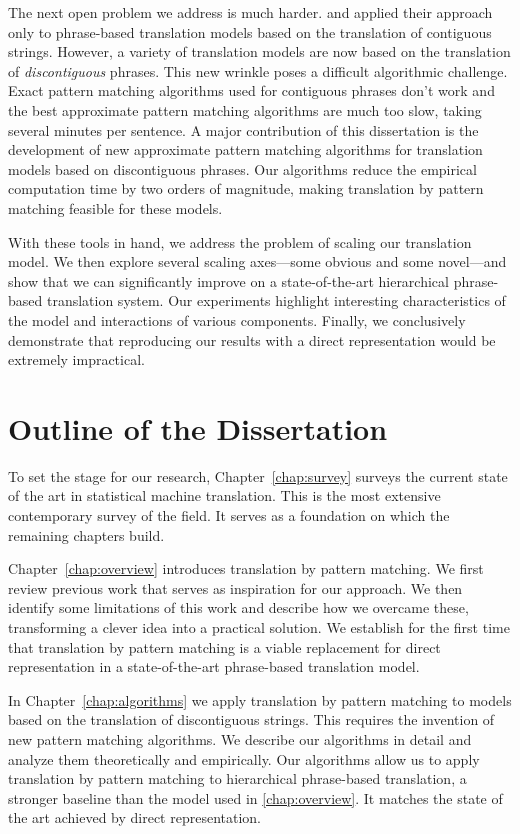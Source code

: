 The next open problem we address is much harder.
\citet{Callison-Burch:2005:acl} and \citet{Zhang:2005:eamt}
applied their approach only to phrase-based translation models 
based on the translation of contiguous strings.  However,
a variety of translation models are now based on the 
translation of {\em discontiguous} phrases.  This new wrinkle
poses a difficult algorithmic challenge.
Exact pattern matching algorithms used for contiguous phrases don't work and
the best approximate pattern matching algorithms are much too slow,
taking several minutes per sentence.  A major contribution of
this dissertation is the development of new approximate 
pattern matching algorithms for translation models based on
discontiguous phrases.  Our algorithms reduce the empirical computation
time by two orders of magnitude, making translation by pattern matching
feasible for these models.

With these tools in hand, we address the problem of scaling
our translation model.  We then explore several scaling axes---some obvious and 
some novel---and show that we can significantly improve on 
a state-of-the-art hierarchical phrase-based translation system.  
Our experiments highlight interesting characteristics of the model
and interactions of various components.
Finally, we conclusively demonstrate that reproducing our results
with a direct representation would be extremely impractical.

\section{Outline of the Dissertation}

To set the stage for our research, Chapter~\ref{chap:survey} surveys the
current state of the art in statistical machine translation.  This is the
most extensive contemporary survey of the field.  It serves as a foundation 
on which the remaining chapters build.

Chapter~\ref{chap:overview} introduces translation by pattern matching.  We first
review previous work that serves as inspiration for our approach.  We then identify
some limitations of this work
and describe how we overcame these, transforming a clever idea into a 
practical solution.  We establish for the first time 
that translation by pattern matching is a
viable replacement for direct representation in a state-of-the-art phrase-based
translation model.

In Chapter~\ref{chap:algorithms} we apply translation by pattern matching to models
based on the translation of discontiguous strings.  This requires the invention 
of new pattern matching algorithms.  We describe our
algorithms in detail and analyze them theoretically and empirically.  Our algorithms
allow us to apply translation by pattern matching to hierarchical
phrase-based translation, a stronger baseline than the model used
in \ref{chap:overview}.  It matches the state of the art
achieved by direct representation.

